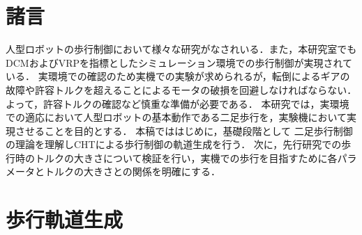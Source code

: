 \documentclass[twocolumn]{jsarticle}
\date{2019年05月30日}
\begin{document}
\mtitle



% 
\section{諸言}
人型ロボットの歩行制御において様々な研究がなされいる．また，本研究室でもDCMおよびVRPを指標としたシミュレーション環境での歩行制御が実現されている．
実環境での確認のため実機での実験が求められるが，転倒によるギアの故障や許容トルクを超えることによるモータの破損を回避しなければならない．
よって，許容トルクの確認など慎重な準備が必要である．
本研究では，実環境での適応において人型ロボットの基本動作である二足歩行を，実験機において実現させることを目的とする．
本稿でははじめに，基礎段階として%
二足歩行制御の理論を理解しCHTによる歩行制御の軌道生成を行う．
次に，先行研究での歩行時のトルクの大きさについて検証を行い，実機での歩行を目指すために各パラメータとトルクの大きさとの関係を明確にする．
\section{歩行軌道生成}
\end{document}

